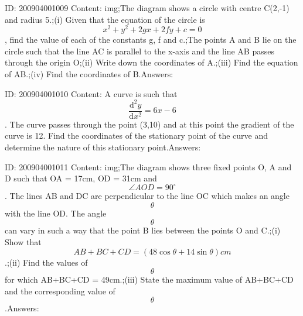 \documentclass{article}
\begin{document}
ID: 200904001009
Content:
img;The diagram shows a circle with centre C(2,-1) and radius 5.;(i) Given that the equation of the circle is $$x^2 +y^2+2gx+2fy+c=0$$, find the value of each of the constants g, f and c.;The points A and B lie on the circle such that the line AC is parallel to the x-axis and the line AB passes through the origin O;(ii) Write down the coordinates of A.;(iii) Find the equation of AB.;(iv) Find the coordinates of B.Answers:

ID: 200904001010
Content:
A curve is such that $$\frac{\mathrm{d} ^{2}y}{\mathrm{d} x^{2}}= 6x-6$$. The curve passes through the point (3,10) and at this point the gradient of the curve is 12. Find the coordinates of the stationary point of the curve and determine the nature of this stationary point.Answers:

ID: 200904001011
Content:
img;The diagram shows three fixed points O, A and D such that OA = 17cm, OD = 31cm and $$\angle AOD =90^{\circ}$$. The lines AB and DC are perpendicular to the line OC which makes an angle $$\theta$$ with the line OD. The angle $$\theta$$ can vary in such a way that the point B lies between the points O and C.;(i) Show that $$AB + BC + CD = (48\cos  \theta + 14 \sin  \theta)cm$$.;(ii) Find the values of $$\theta$$ for which AB+BC+CD = 49cm.;(iii) State the maximum value of AB+BC+CD and the corresponding value of $$\theta$$.Answers:
\end{document}
